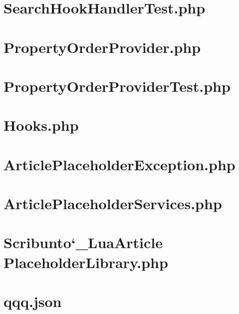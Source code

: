 \chapter{SearchHookHandlerTest.php}


\chapter{PropertyOrderProvider.php}


\chapter{PropertyOrderProviderTest.php}


\chapter{Hooks.php}


\chapter{ArticlePlaceholderException.php}


\chapter{ArticlePlaceholderServices.php}


\chapter{Scribunto\char`_LuaArticle PlaceholderLibrary.php}


\chapter{qqq.json}


